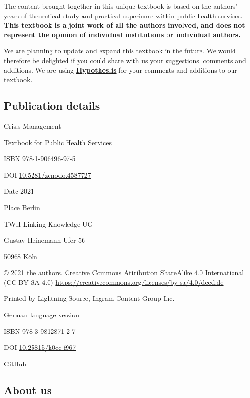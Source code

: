 \documentclass{article}
\begin{document}
The content brought together in this unique textbook is based on the authors' years of theoretical study and practical experience within public health services. \textbf{This textbook is a joint work of all the authors involved, and does not represent the opinion of individual institutions or individual authors.}


We are planning to update and expand this textbook in the future. We would therefore be delighted if you could share with us your suggestions, comments and additions. We are using \textbf{\href{https://hypothes.is/}{Hypothes.is}} for your comments and additions to our textbook.


\subsection{Publication details}\label{H8111132}



Crisis Management

Textbook for Public Health Services

ISBN 978-1-906496-97-5

DOI \href{https://zenodo.org/deposit/4587727}{10.5281/zenodo.4587727}

Date 2021

Place Berlin


TWH Linking Knowledge UG

Gustav-Heinemann-Ufer 56

50968 Köln


© 2021 the authors. Creative Commons Attribution ShareAlike 4.0 International (CC BY-SA 4.0) \href{https://creativecommons.org/licenses/by-sa/4.0/deed.de}{https://creativecommons.org/licenses/by-sa/4.0/deed.de}

Printed by Lightning Source, Ingram Content Group Inc.


German language version

ISBN 978-3-9812871-2-7

DOI \href{https://doi.org/10.25815/h0ec-f967}{10.25815/h0ec-f967}

\href{https://akademie-oeffentliches-gesundheitswesen.github.io/krisenmanagment/}{GitHub}





\subsection{About us}\label{H2129478}
\end{document}
